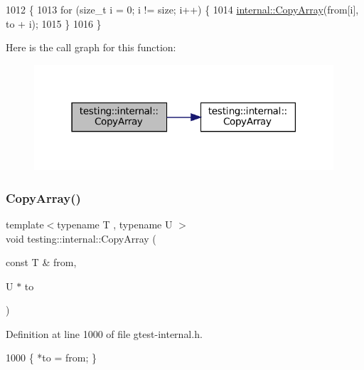 \begin{DoxyCode}
1012                                                   \{
1013   \textcolor{keywordflow}{for} (\textcolor{keywordtype}{size\_t} i = 0; i != size; i++) \{
1014     \hyperlink{namespacetesting_1_1internal_a1e7ae855686720615dcd5754c8181c62}{internal::CopyArray}(from[i], to + i);
1015   \}
1016 \}
\end{DoxyCode}
Here is the call graph for this function\+:
\nopagebreak
\begin{figure}[H]
\begin{center}
\leavevmode
\includegraphics[width=316pt]{namespacetesting_1_1internal_afb1b9728aaaf6d9fe6246a19cfe3f7f5_cgraph}
\end{center}
\end{figure}
\mbox{\label{namespacetesting_1_1internal_a84d0e746ba0827cc52b53d22000de0e8}} 
\subsubsection{\texorpdfstring{Copy\+Array()}{CopyArray()}\hspace{0.1cm}{\footnotesize\ttfamily [2/3]}}
{\footnotesize\ttfamily template$<$typename T , typename U $>$ \\
void testing\+::internal\+::\+Copy\+Array (\begin{DoxyParamCaption}\item[{const T \&}]{from,  }\item[{U $\ast$}]{to }\end{DoxyParamCaption})\hspace{0.3cm}{\ttfamily [inline]}}



Definition at line 1000 of file gtest-\/internal.\+h.


\begin{DoxyCode}
1000 \{ *to = from; \}
\end{DoxyCode}
\mbox{\label{namespacetesting_1_1internal_a1e7ae855686720615dcd5754c8181c62}} 
